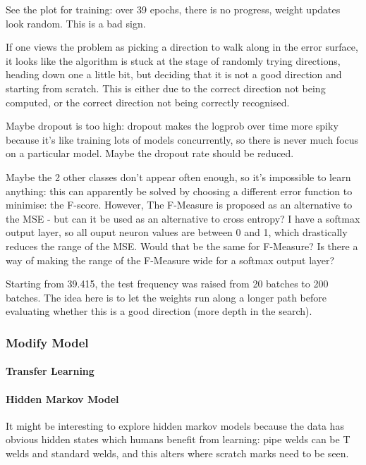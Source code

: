 \documentclass[a4paper,11pt]{article}
\begin{document}
See the plot for training: over 39 epochs, there is no progress, weight updates look random. This is a bad sign.

If one views the problem as picking a direction to walk along in the error surface, it looks like the algorithm is stuck at the stage of randomly trying directions, heading down one a little bit, but deciding that it is not a good direction and starting from scratch. This is either due to the correct direction not being computed, or the correct direction not being correctly recognised.

Maybe dropout is too high: dropout makes the logprob over time more spiky because it's like training lots of models concurrently, so there is never much focus on a particular model. Maybe the dropout rate should be reduced.

Maybe the 2 other classes don't appear often enough, so it's impossible to learn anything: this can apparently be solved by choosing a different error function to minimise: the F-score\cite{f-measure}. However, The F-Measure is proposed as an alternative to the MSE - but can it be used as an alternative to cross entropy? I have a softmax output layer, so all ouput neuron values are between 0 and 1, which drastically reduces the range of the MSE. Would that be the same for F-Measure? Is there a way of making the range of the F-Measure wide for a softmax output layer? 

Starting from 39.415, the test frequency was raised from 20 batches to 200 batches. The idea here is to let the weights run along a longer path before evaluating whether this is a good direction (more depth in the search).



\subsubsection{Modify Model}

\paragraph{Transfer Learning}

\paragraph{Hidden Markov Model}

It might be interesting to explore hidden markov models because the data has obvious hidden states which humans benefit from learning: pipe welds can be T welds and standard welds, and this alters where scratch marks need to be seen.
\end{document}
